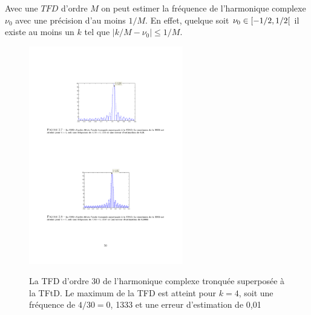 Avec une $TFD$ d'ordre $M$ on peut estimer la fr\'{e}quence de l'harmonique complexe $\nu_{0}$ avec une pr\'{e}cision d'au moins $1/M$.
En effet, quelque soit $\nu_{0} \in \left[-1/2,1/2\right[$ il existe au moins un $k$ tel que  $|k/M - \nu_0| \leq 1/M$.
\begin{figure}
  \centering
  \includegraphics[width=0.6\textwidth]{Figures/Figure2-7}\\
  \caption{La TFD d'ordre 30 de l'harmonique complexe tronqu\'{e}e superpos\'{e}e \`{a} la TFtD. Le maximum de la TFD est atteint pour $k=4$, soit une fr\'{e}quence de $4/30=0$, 1333 et une erreur d'estimation de 0,01}\label{fig:figure2-7}
\end{figure}


